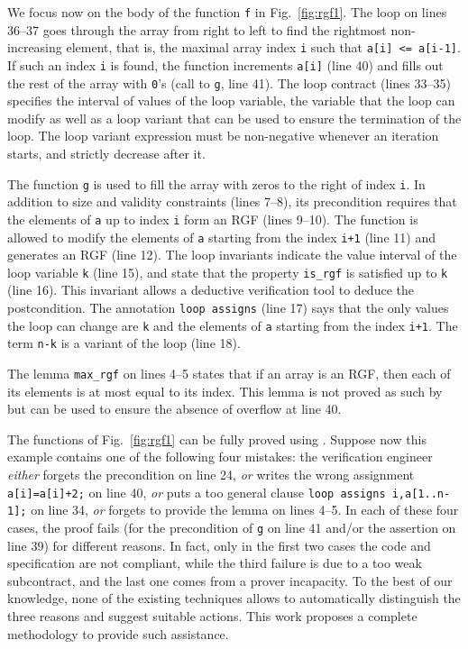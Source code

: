 We focus now on the body of the function \lstinline{f} in
Fig.~\ref{fig:rgf1}. 
The loop on lines 36--37 goes through the array from right
to left to find the rightmost non-increasing element, that is,
the maximal  array index \lstinline{i} such that \lstinline{a[i] <= a[i-1]}.
If such an index \lstinline{i} is found,
the function increments \lstinline{a[i]} (line 40) and fills out the rest
of the array with \lstinline{0}'s (call to \lstinline{g}, line 41).
The loop contract (lines 33--35) specifies the interval of values of the loop variable,
the variable that the loop can modify as well as a loop variant 
that can be used to ensure the termination of the loop.
The loop variant expression must be non-negative whenever an iteration starts,
and strictly decrease after it.

The function \lstinline{g} is used to fill the array with zeros to the right of index \lstinline{i}.
In addition to size and validity constraints (lines 7--8),
its precondition requires that the elements of \lstinline{a} up to index  \lstinline{i}
form an RGF (lines 9--10). 
The function is allowed to modify the elements of \lstinline{a} starting from the index \lstinline{i+1} (line 11)
and generates an RGF (line 12).
The loop invariants 
indicate the value interval of the loop variable \lstinline{k} (line 15), 
and state that the property \lstinline{is_rgf} is satisfied
up to \lstinline{k} (line 16).
This invariant allows a deductive verification tool to deduce the postcondition.
The annotation \lstinline{loop assigns} (line 17) says that the only values the loop can
change are \lstinline{k} and the elements of \lstinline{a} starting from the index \lstinline{i+1}.
The term \lstinline{n-k} is a variant of the loop (line 18).

The \acsl lemma \lstinline'max_rgf' on lines 4--5
states
that if an array is an RGF, then each of its elements is at most equal to its
index.
This lemma is not proved as such by \Wp but can be used to ensure the absence of
overflow at line 40.

The functions of Fig.~\ref{fig:rgf1} can be fully proved using \Wp.
Suppose now this example contains one of the  following four mistakes: 
the verification engineer \emph{either} forgets the precondition on line 24, 
\emph{or} writes the wrong assignment \lstinline[style=c]'a[i]=a[i]+2;' on line 40,
\emph{or} puts a too general clause \lstinline[style=c]'loop assigns i,a[1..n-1];' on line 34,
\emph{or} forgets to provide the lemma  on lines 4--5.
In each of these four cases, the proof  fails (for the precondition of \lstinline{g} on line 41 
and/or the assertion on line 39) for different reasons.
In fact, only in the first two cases the code and specification are not compliant, while
the third failure is due to a too weak subcontract, and the last one comes from a prover incapacity.
To the best of our knowledge, 
none of the existing  techniques allows to automatically
distinguish the three reasons and suggest suitable actions.
This work proposes a complete methodology to provide such assistance.


